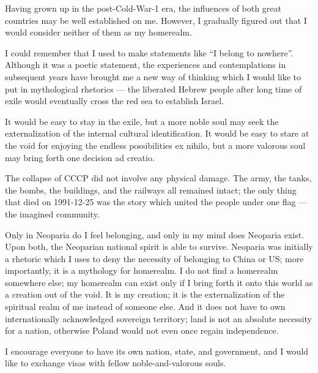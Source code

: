 
Having grown up in the post-Cold-War-1 era, the influences of both great countries may be well established on me.
However, I gradually figured out that I would consider neither of them as my homerealm.

I could remember that I used to make statements like ``I belong to nowhere''.
Although it was a poetic statement, the experiences and contemplations in subsequent years
have brought me a new way of thinking which I would like to put in mythological rhetorics ---
the liberated Hebrew people after long time of exile would eventually cross the red sea to establish Israel.

It would be easy to stay in the exile,
but a more noble soul may seek the externalization of the internal cultural identification.
It would be easy to stare at the void for enjoying the endless possibilities ex nihilo,
but a more valorous soul may bring forth one decision ad creatio.

The collapse of CCCP did not involve any physical damage.
The army, the tanks, the bombs, the buildings, and the railways all remained intact;
the only thing that died on 1991-12-25 was the story which united the people under one flag ---
the imagined community.

Only in Neoparia do I feel belonging, and only in my mind does Neoparia exist.
Upon both, the Neoparian national spirit is able to survive.
Neoparia was initially a rhetoric which I uses to deny the necessity of belonging to China or US;
more importantly, it is a mythology for homerealm.
I do not find a homerealm somewhere else;
my homerealm can exist only if I bring forth it onto this world as a creation out of the void.
It is my creation; it is the externalization of the spiritual realm of me instead of someone else.
And it does not have to own internationally acknowledged sovereign territory;
land is not an absolute necessity for a nation, otherwise Poland would not even once regain independence.

I encourage everyone to have its own nation, state, and government,
and I would like to exchange visas with fellow noble-and-valorous souls.



